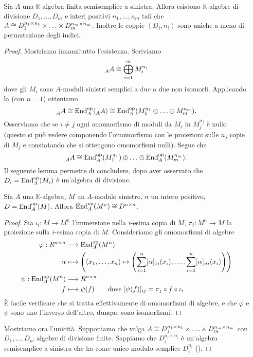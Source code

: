 \begin{proposition}
Sia $A$ una $\mathbb{K}$-algebra finita semisemplice a sinistra. Allora esistono $\mathbb{K}$-algebre di divisione $D_1,\ldots,D_m$ e interi positivi $n_1,\ldots, n_m$ tali che $A\cong D_1^{n_1\times n_1}\times\ldots\times D_m^{n_m\times n_m}$. Inoltre le coppie $(D_i,n_i)$ sono uniche a meno di permutazione degli indici.
\end{proposition}
\begin{proof}
Mostriamo innanzitutto l'esistenza. Scriviamo
$$
\prescript{}{A}{A}\cong\bigoplus_{i=1}^{m}M_i^{n_i}
$$
dove gli $M_i$ sono $A$-moduli sinistri semplici a due a due non isomorfi. Applicando la  (con $n=1$) otteniamo
$$
\prescript{}{A}{A}\cong\operatorname{End}^{\operatorname{op}}_A(\prescript{}{A}{A})\cong\operatorname{End}^{\operatorname{op}}_A(M_1^{n_1}\oplus\ldots\oplus M_m^{n_m}).
$$
Osserviamo che se $i\neq j$ ogni omomorfismo di moduli da $M_i$ in $M_j^{n_j}$ è nullo (questo si può vedere componendo l'omomorfismo con le proiezioni sulle $n_j$ copie di $M_j$ e constatando che si ottengono omomorfismi nulli). Segue che
$$
\prescript{}{A}{A}\cong \operatorname{End}^{\operatorname{op}}_A(M_1^{n_1})\oplus\ldots\oplus\operatorname{End}^{\operatorname{op}}_A(M_m^{n_m}).
$$
Il seguente lemma permette di concludere, dopo aver osservato che $D_i=\operatorname{End}^{\operatorname{op}}_A(M_i)$ è un'algebra di divisione.
\begin{lemma*}
Sia $A$ una $\mathbb{K}$-algebra, $M$ un $A$-modulo sinistro, $n$ un intero positivo, $D=\operatorname{End}^{\operatorname{op}}_A(M)$. Allora $\operatorname{End}^{\operatorname{op}}_A(M^n)\cong D^{n\times n}$.
\end{lemma*}
\begin{proof}
Sia $\iota_i:M\to M^n$ l'immersione nella $i$-esima copia di $M$, $\pi_i:M^n\to M$ la proiezione sulla $i$-esima copia di $M$. Consideriamo gli omomorfismi di algebre
\begin{align*}
\varphi: R^{n\times n}&\longrightarrow\operatorname{End}^{\operatorname{op}}_A(M^n)\\
\alpha&\longmapsto\left((x_1,\ldots,x_n)\mapsto\left(\sum_{i=1}^{n}[\alpha]_{1i}(x_i),\ldots,\sum_{i=1}^{n}[\alpha]_{ni}(x_i)\right)\right)\\
\psi:\operatorname{End}^{\operatorname{op}}_A(M^n)&\longrightarrow R^{n\times n}\\
f&\longmapsto\psi(f)\qquad\text{dove $[\psi(f)]_{ij}=\pi_j\circ f\circ\iota_i$}
\end{align*}
È facile verificare che si tratta effettivamente di omomorfismi di algebre, e che $\varphi$ e $\psi$ sono uno l'inverso dell'altro, dunque sono isomorfismi.
\end{proof}
Mostriamo ora l'unicità. Supponiamo che valga $A\cong D_1^{n_1\times n_1}\times\ldots\times D_m^{n_m\times n_m}$ con $D_1,\ldots,D_m$ algebre di divisione finite. Sappiamo che $D_i^{n_i\times n_i}$ è un'algebra semisemplice a sinistra che ha come unico modulo semplice $D_i^{n_i}$ ().
\end{proof}




